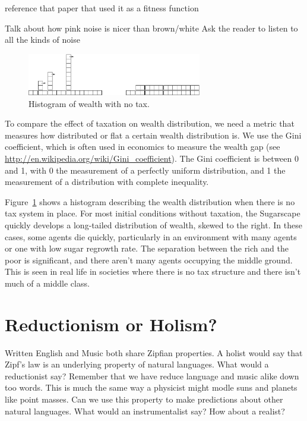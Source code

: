 \documentclass[10pt]{book}
\begin{document}
reference that paper that used it as a fitness function

Talk about how pink noise is nicer than brown/white
Ask the reader to listen to all the kinds of noise

\begin{figure}[ht]
\centerline{\includegraphics[width=3.0in]{figs/towers}}
\caption{Histogram of wealth with no tax.\label{fig.notax}}
\end{figure}

To compare the effect of taxation on wealth distribution, we need a
metric that measures how distributed or flat a certain wealth
distribution is.  We use the Gini coefficient, which is often used in
economics to measure the wealth gap (see
\url{http://en.wikipedia.org/wiki/Gini_coefficient}). The Gini
coefficient is between 0 and 1, with 0 the measurement of a perfectly
uniform distribution, and 1 the measurement of a distribution with
complete inequality.

Figure~\ref{fig.notax} shows a histogram describing the wealth
distribution when there is no tax system in place. For most initial
conditions without taxation, the Sugarscape quickly develops a
long-tailed distribution of wealth, skewed to the right. In these
cases, some agents die quickly, particularly in an environment with
many agents or one with low sugar regrowth rate. The separation
between the rich and the poor is significant, and there aren't many
agents occupying the middle ground. This is seen in real life in
societies where there is no tax structure and there isn't much of a
middle class.


\section{Reductionism or Holism?}

Written English and Music both share Zipfian properties. A holist would say that Zipf's law is an underlying property of natural languages. What would a reductionist say? Remember that we have reduce language and music alike down too words. This is much the same way a physicist might modle suns and planets like point masses. Can we use this property to make predictions about other natural languages. What would an instrumentalist say? How about a realist?
\end{document}

